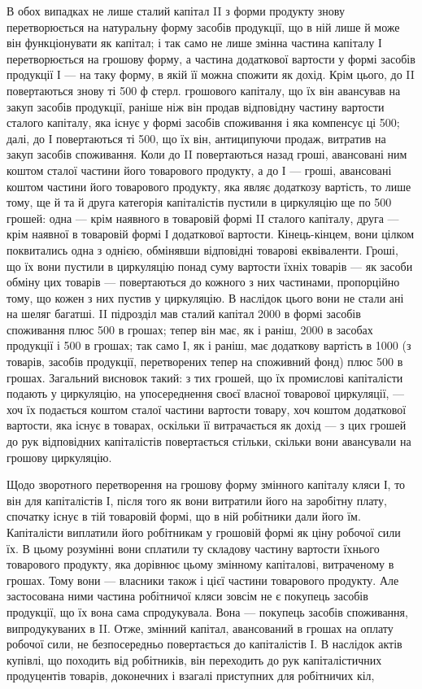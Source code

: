 
В обох випадках не лише сталий капітал II з форми продукту знову
перетворюється на натуральну форму засобів продукції, що в ній лише
й може він функціонувати як капітал; і так само не лише змінна частина
капіталу І перетворюється на грошову форму, а частина додаткової вартости
у формі засобів продукції І — на таку форму, в якій її можна спожити
як дохід. Крім цього, до II повертаються знову ті 500 ф стерл. грошового
капіталу, що їх він авансував на закуп засобів продукції, раніше ніж він
продав відповідну частину вартости сталого капіталу, яка існує у формі
засобів споживання і яка компенсує ці 500; далі, до І повертаються
ті 500, що їх він, антиципуючи продаж, витратив на
закуп засобів споживання. Коли до II повертаються назад гроші, авансовані
ним коштом сталої частини його товарового продукту, а до І — гроші,
авансовані коштом частини його товарового продукту, яка являє додаткозу
вартість, то лише тому, ще й та й друга категорія капіталістів пустили
в циркуляцію ще по 500 грошей: одна — крім наявного
в товаровій формі II сталого капіталу, друга — крім наявної в товаровій
формі І додаткової вартости. Кінець-кінцем, вони цілком поквитались одна
з однією, обмінявши відповідні товарові еквіваленти. Гроші, що їх вони
пустили в циркуляцію понад суму вартости їхніх товарів — як засоби обміну
цих товарів — повертаються до кожного з них частинами, пропорційно
тому, що кожен з них пустив у циркуляцію. В наслідок цього вони не
стали ані на шеляг багатші. II підрозділ мав сталий капітал \deq{} 2000 в формі
засобів споживання плюс 500 в грошах; тепер він має, як і раніш, 2000
в засобах продукції і 500 в грошах; так само І, як і раніш, має додаткову
вартість в 1000 (з товарів, засобів продукції, перетворених тепер
на споживний фонд) плюс 500 в грошах. Загальний висновок такий:
з тих грошей, що їх промислові капіталісти подають у циркуляцію, на
упосереднення своєї власної товарової циркуляції, — хоч їх подається
коштом сталої частини вартости товару, хоч коштом додаткової вартости,
яка існує в товарах, оскільки її витрачається як дохід — з цих грошей до
рук відповідних капіталістів повертається стільки, скільки вони авансували
на грошову циркуляцію.

Щодо зворотного перетворення на грошову форму змінного капіталу
кляси І, то він для капіталістів І, після того як вони витратили його на
заробітну плату, спочатку існує в тій товаровій формі, що в ній робітники
дали його їм. Капіталісти виплатили його робітникам у грошовій
формі як ціну робочої сили їх. В цьому розумінні вони сплатили ту
складову частину вартости їхнього товарового продукту, яка дорівнює
цьому змінному капіталові, витраченому в грошах. Тому вони — власники також
і цієї частини товарового продукту. Але застосована ними частина робітничої
кляси зовсім не є покупець засобів продукції, що їх вона сама
спродукувала. Вона — покупець засобів споживання, випродукуваних в II.
Отже, змінний капітал, авансований в грошах на оплату робочої сили, не
безпосередньо повертається до капіталістів І. В наслідок актів купівлі,
що походить від робітників, він переходить до рук капіталістичних продуцентів
товарів, доконечних і взагалі приступних для робітничих кіл,
\parbreak{}  %
